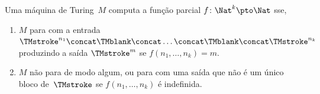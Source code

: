 \documentclass[../../../include/open-logic-section]{subfiles}
\begin{document}
\begin{defn}
  Uma máquina de Turing~$M$ computa a função parcial $f\colon \Nat^k
  \pto \Nat$ sse, 
  \begin{enumerate}
    \item $M$ para com a entrada $\TMstroke^{n_1}\concat\TMblank\concat
    \dots \concat\TMblank\concat\TMstroke^{n_k}$ produzindo a saída $\TMstroke^{m}$ se $f(n_1, \dots, n_k) = m$.
    \item $M$ não para de modo algum, ou para com uma saída que não é um
    único bloco de~$\TMstroke$ se $f(n_1, \dots, n_k)$ é indefinida.
  \end{enumerate}
\end{defn}
\end{document}
